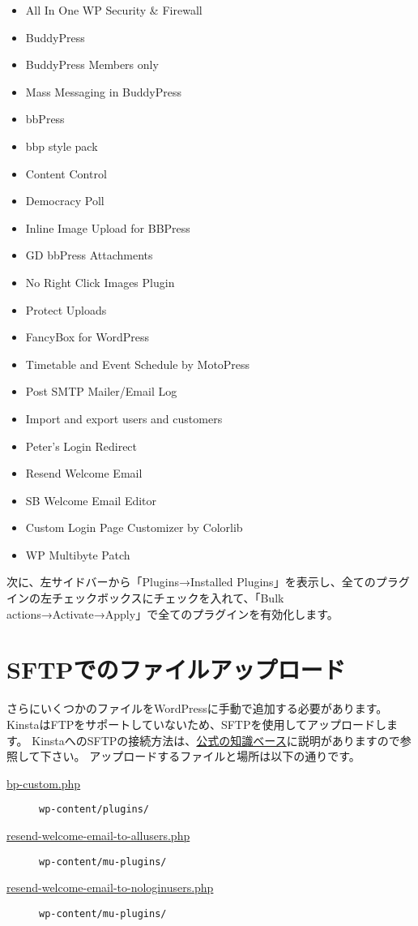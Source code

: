 \documentclass[titlepage,10pt,a4paper,uplatex]{jsbook}
\begin{document}
\begin{itemize}
\item All In One WP Security \& Firewall
\item BuddyPress
\item BuddyPress Members only
\item Mass Messaging in BuddyPress
\item bbPress
\item bbp style pack
\item Content Control
\item Democracy Poll
\item Inline Image Upload for BBPress
\item GD bbPress Attachments
\item No Right Click Images Plugin
\item Protect Uploads
\item FancyBox for WordPress
\item Timetable and Event Schedule by MotoPress
\item Post SMTP Mailer/Email Log
\item Import and export users and customers
\item Peter's Login Redirect
\item Resend Welcome Email
\item SB Welcome Email Editor
\item Custom Login Page Customizer by Colorlib
\item WP Multibyte Patch
\end{itemize}

次に、左サイドバーから「Plugins→Installed Plugins」を表示し、全てのプラグインの左チェックボックスにチェックを入れて、「Bulk actions→Activate→Apply」で全てのプラグインを有効化します。

\section{SFTPでのファイルアップロード}

さらにいくつかのファイルをWordPressに手動で追加する必要があります。
KinstaはFTPをサポートしていないため、SFTPを使用してアップロードします。
KinstaへのSFTPの接続方法は、\href{https://kinsta.com/jp/knowledgebase/how-to-use-sftp/}{公式の知識ベース}に説明がありますので参照して下さい。
アップロードするファイルと場所は以下の通りです。

\begin{description}
\item[\href{https://github.com/astanabe/OnlineAnnualMeeting/blob/main/bp-custom.php}{bp-custom.php}] \texttt{wp-content/plugins/}
\item[\href{https://github.com/astanabe/OnlineAnnualMeeting/blob/main/resend-welcome-email-to-allusers.php}{resend-welcome-email-to-allusers.php}] \texttt{wp-content/mu-plugins/}
\item[\href{https://github.com/astanabe/OnlineAnnualMeeting/blob/main/resend-welcome-email-to-nologinusers.php}{resend-welcome-email-to-nologinusers.php}] \texttt{wp-content/mu-plugins/}
\end{description}
\end{document}
